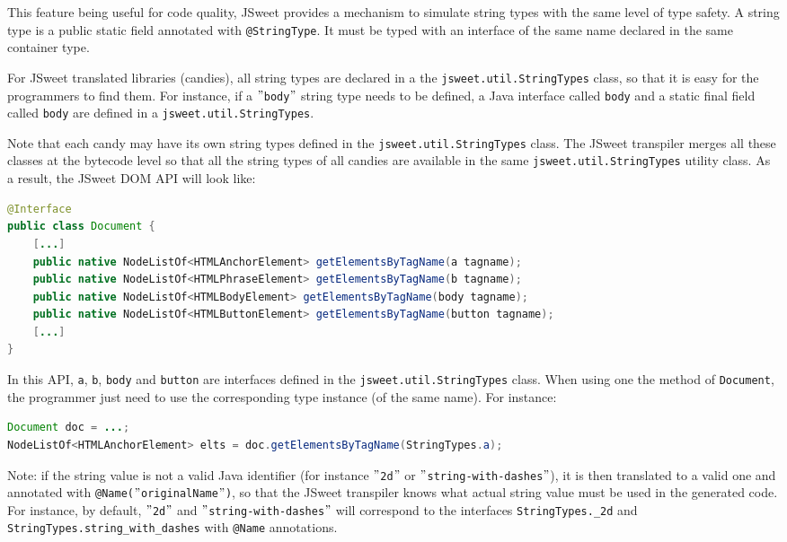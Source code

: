 \documentclass[a4paper]{report}
\begin{document}
This feature being useful for code quality, JSweet provides a mechanism to simulate string types with the same level of type safety. A string type is a public static field annotated with \texttt{@StringType}. It must be typed with an interface of the same name declared in the same container type. 

For JSweet translated libraries (candies), all string types are declared in a the \texttt{jsweet.\-util.\-String\-Types} class, so that it is easy for the programmers to find them. For instance, if a \texttt{$"$body$"$} string type needs to be defined, a Java interface called \texttt{body} and a static final field called \texttt{body} are defined in a \texttt{jsweet.\-util.\-String\-Types}.

Note that each candy may have its own string types defined in the \texttt{jsweet.\-util.\-String\-Types} class. The JSweet transpiler merges all these classes at the bytecode level so that all the string types of all candies are available in the same \texttt{jsweet.\-util.\-String\-Types} utility class. As a result, the JSweet DOM API will look like:

\begin{lstlisting}[language=Java]
@Interface
public class Document {
	[...]
	public native NodeListOf<HTMLAnchorElement> getElementsByTagName(a tagname);
	public native NodeListOf<HTMLPhraseElement> getElementsByTagName(b tagname);
	public native NodeListOf<HTMLBodyElement> getElementsByTagName(body tagname);
	public native NodeListOf<HTMLButtonElement> getElementsByTagName(button tagname);
	[...]
}
\end{lstlisting}

In this API, \texttt{a}, \texttt{b}, \texttt{body} and \texttt{button} are interfaces defined in the \texttt{jsweet.\-util.\-String\-Types} class. When using one the method of \texttt{Document}, the programmer just need to use the corresponding type instance (of the same name). For instance:

\begin{lstlisting}[language=Java]
Document doc = ...;
NodeListOf<HTMLAnchorElement> elts = doc.getElementsByTagName(StringTypes.a);
\end{lstlisting}

Note: if the string value is not a valid Java identifier (for instance \texttt{$"$2d$"$} or \texttt{$"$string-with-dashes$"$}), it is then translated to a valid one and annotated with \texttt{@Name($"$originalName$"$)}, so that the JSweet transpiler knows what actual string value must be used in the generated code. For instance, by default, \texttt{$"$2d$"$} and \texttt{$"$string-with-dashes$"$} will correspond to the interfaces \texttt{StringTypes.\_2d} and \texttt{StringTypes.string\_with\_dashes} with \texttt{@Name} annotations.
\end{document}
